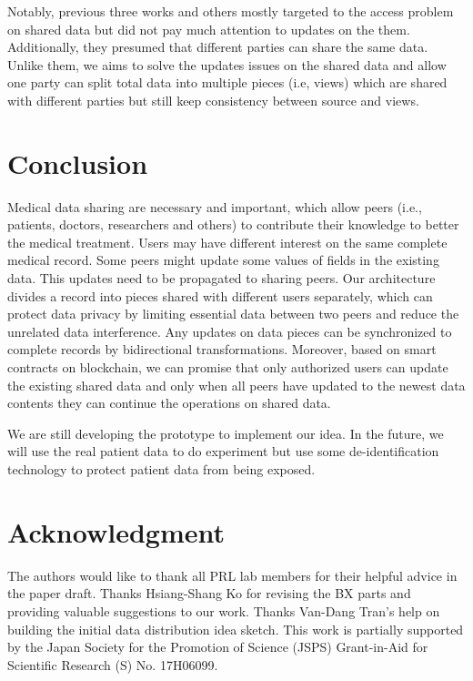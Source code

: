 \documentclass[conference]{IEEEtran}
\begin{document}
Notably, previous three works and others \cite{liu2018bpds,xia2017bbds,amofa2018blockchain,dagher2018ancile,fan2018medblock} mostly targeted to the access problem on shared data but did not pay much attention to updates on the them. Additionally, they presumed that different parties can share the same data. Unlike them, we aims to solve the updates issues on the shared data and allow one party can split total data into multiple pieces (i.e, views) which are shared with different parties but still keep consistency between source and views.

\section{Conclusion}
\label{conclude}

Medical data sharing are necessary and important, which allow peers (i.e., patients, doctors, researchers and others) to contribute their knowledge to better the medical treatment. Users may have different interest on the same complete medical record. Some peers might update some values of fields in the existing data. This updates need to be propagated to sharing peers. Our architecture divides a record into pieces shared with different users separately, which can protect data privacy by limiting essential data between two peers and reduce the unrelated data interference. Any updates on data pieces can be synchronized to complete records by bidirectional transformations. Moreover, based on smart contracts on blockchain, we can promise that only authorized users can update the existing shared data and only when all peers have updated to the newest data contents they can continue the operations on shared data.   

We are still developing the prototype to implement our idea.
In the future, we will use the real patient data to do experiment but use some de-identification technology to protect patient data from being exposed. 

\section*{Acknowledgment}
The authors would like to thank all PRL lab members for their helpful advice in the paper draft.  Thanks Hsiang-Shang Ko for revising the BX parts and providing valuable suggestions to our work. Thanks Van-Dang Tran's help on building the initial data distribution idea sketch. This work is partially supported by the Japan Society for the Promotion of Science (JSPS) Grant-in-Aid for Scientific Research (S) No. 17H06099.



\end{document}
